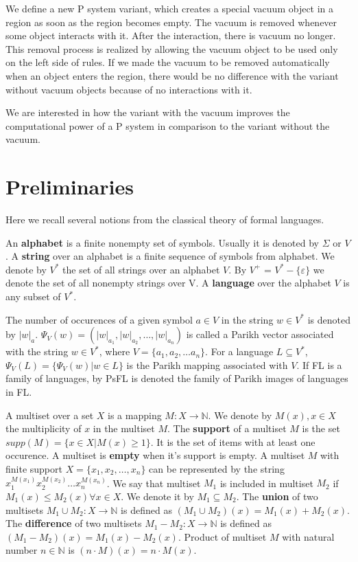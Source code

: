 \documentclass[a4paper,10pt]{article}
\def\eps{\varepsilon}
\begin{document}
We define a new P system variant, which creates a special vacuum object in a region as soon as the region becomes empty. The vacuum is removed whenever some object interacts with it. After the interaction, there is vacuum no longer. This removal process is realized by allowing the vacuum object to be used only on the left side of rules.
If we made the vacuum to be removed automatically when an object enters the region, there would be no difference with the variant without vacuum objects because of no interactions with it.

We are interested in how the variant with the vacuum improves the computational power of a P system in comparison to the variant without the vacuum.

\section{Preliminaries}

Here we recall several notions from the classical theory of formal languages.

An {\bf alphabet} is a finite nonempty set of symbols. Usually it is denoted by $\Sigma$ or $V$. A {\bf string} over an alphabet is a finite sequence of symbols from alphabet. We denote by $V^*$ the set of all strings over an alphabet $V$. By $V^+$ = $V^* - \{\eps\}$ we denote the set of all nonempty strings over V. A {\bf language} over the alphabet $V$ is any subset of $V^*$.

The number of occurences of a given symbol $a\in V$ in the string $w\in V^*$ is denoted by $|w|_a$. $\Psi_V(w)=(|w|_{a_1},|w|_{a_2},\dots,|w|_{a_n})$ is called a Parikh vector associated with the string $w\in V^*$, where $V=\{a_1,a_2,\dots a_n\}$. For a language $L\subseteq V^*$, $\Psi_V(L)=\{\Psi_V(w)|w\in L\}$ is the Parikh mapping associated with $V$. If FL is a family of languages, by PsFL is denoted the family of Parikh images of languages in FL.

A multiset over a set $X$ is a mapping $M: X\rightarrow \mathbb N$. We denote by $M(x), x\in X$ the multiplicity of $x$ in the multiset $M$. The {\bf support} of a multiset $M$ is the set $supp(M)=\{x\in X|M(x)\geq 1\}$. It is the set of items with at least one occurence. A multiset is {\bf empty} when it's support is empty. A multiset $M$ with finite support $X = \{x_1, x_2, \dots, x_n\}$ can be represented by the string $x_1^{M(x_1)}x_2^{M(x_2)}\dots x_n^{M(x_n)}$. We say that multiset $M_1$ is included in multiset $M_2$ if $M_1(x)\leq M_2(x)\forall x \in X$. We denote it by $M_1\subseteq M_2$. The {\bf union} of two multisets $M_1\cup M_2 : X\rightarrow \mathbb N$ is defined as $(M_1\cup M_2)(x)=M_1(x)+M_2(x)$. The {\bf difference} of two multisets $M_1-M_2 : X\rightarrow \mathbb N$ is defined as $(M_1-M_2)(x)=M_1(x)-M_2(x)$. Product of multiset $M$ with natural number $n\in \mathbb N$ is $(n\cdot M)(x)=n\cdot M(x)$.
  
\end{document}
